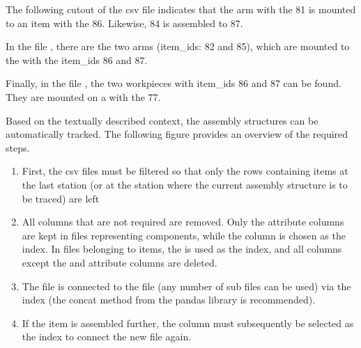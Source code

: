 \documentclass[letterpaper,10pt,english]{sphinxmanual}
\begin{document}
\sphinxAtStartPar
The following cutout of the csv file  indicates that the arm with the  81 is mounted to an
 item with the  86. Likewise,  84 is assembled to  87.


\sphinxAtStartPar
In the file , there are the two arms (item\_ids: 82 and 85), which are mounted to the  with the
item\_ids 86 and 87.


\sphinxAtStartPar
Finally, in the file , the two workpieces with item\_ids 86 and 87 can be found. They are mounted on a
 with the  77.


\sphinxAtStartPar
Based on the textually described context, the assembly structures can be automatically tracked. The following figure
provides an overview of the required steps.
\begin{enumerate}
%
\item {} 
\sphinxAtStartPar
First, the csv files must be filtered so that only the rows containing items at the last station (or at the station
where the current assembly structure is to be traced) are left

\item {} 
\sphinxAtStartPar
All columns that are not required are removed. Only the attribute columns are kept in files representing 
components, while the  column is chosen as the index. In files belonging to  items, the  is used
as the index, and all columns except the  and attribute columns are deleted.

\item {} 
\sphinxAtStartPar
The  file is connected to the  file (any number of sub files can be used) via the index (the concat method
from the pandas library is recommended).

\item {} 
\sphinxAtStartPar
If the  item is assembled further, the  column must subsequently be selected as the index to connect the
new file again.

\end{enumerate}
\end{document}

